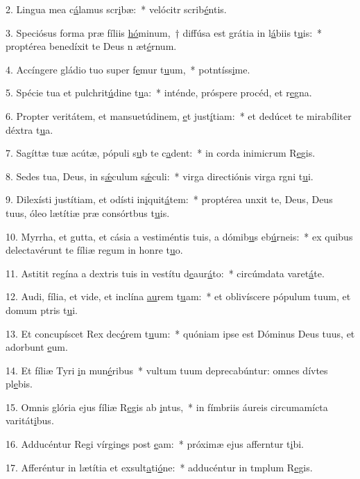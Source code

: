 2. Lingua mea c\uline{á}lamus scr\uline{i}bæ:~* velócitr scrib\uline{é}ntis.\par 
3. Speciósus forma præ fíliis \uline{hó}minum,~† diffúsa est grátia in l\uline{á}biis t\uline{u}is:~* proptérea benedíxit te Deus n æt\uline{é}rnum.\par 
4. Accíngere gládio tuo super f\uline{e}mur t\uline{u}um,~* potntíss\uline{i}me.\par 
5. Spécie tua et pulchrit\uline{ú}dine t\uline{u}a:~* inténde, próspere procéd, et r\uline{e}gna.\par 
6. Propter veritátem, et mansuetúdinem, \uline{e}t just\uline{í}tiam:~* et dedúcet te mirabíliter déxtra t\uline{u}a.\par 
7. Sagíttæ tuæ acútæ, pópuli s\uline{u}b te c\uline{a}dent:~* in corda inimicrum R\uline{e}gis.\par 
8. Sedes tua, Deus, in s\uline{ǽ}culum s\uline{ǽ}culi:~* virga directiónis virga rgni t\uline{u}i.\par 
9. Dilexísti justítiam, et odísti in\uline{i}quit\uline{á}tem:~* proptérea unxit te, Deus, Deus tuus, óleo lætítiæ præ consórtbus t\uline{u}is.\par 
10. Myrrha, et gutta, et cásia a vestiméntis tuis, a dómib\uline{u}s eb\uline{ú}rneis:~* ex quibus delectavérunt te fíliæ regum in honre t\uline{u}o.\par 
11. Astitit regína a dextris tuis in vestítu d\uline{e}aur\uline{á}to:~* circúmdata varet\uline{á}te.\par 
12. Audi, fília, et vide, et inclína \uline{au}rem t\uline{u}am:~* et oblivíscere pópulum tuum, et domum ptris t\uline{u}i.\par 
13. Et concupíscet Rex dec\uline{ó}rem t\uline{u}um:~* quóniam ipse est Dóminus Deus tuus, et adorbunt \uline{e}um.\par 
14. Et fíliæ Tyri \uline{i}n mun\uline{é}ribus~* vultum tuum deprecabúntur: omnes dívtes pl\uline{e}bis.\par 
15. Omnis glória ejus fíliæ R\uline{e}gis ab \uline{i}ntus,~* in fímbriis áureis circumamícta varitát\uline{i}bus.\par 
16. Adducéntur Regi vírgin\uline{e}s post \uline{e}am:~* próximæ ejus afferntur t\uline{i}bi.\par 
17. Afferéntur in lætítia et exsult\uline{a}ti\uline{ó}ne:~* adducéntur in tmplum R\uline{e}gis.\par 
